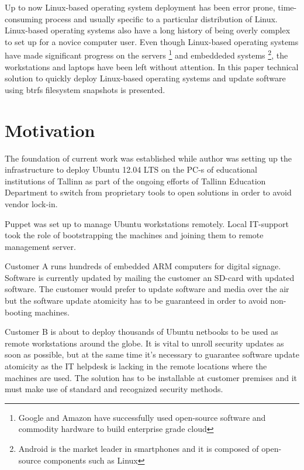 \documentclass[a4paper,11pt]{kth-mag}
\begin{document}
Up to now Linux-based operating system deployment has been
error prone, time-consuming process and usually specific to
a particular distribution of Linux.
Linux-based operating systems also have a long history
of being overly complex to set up for a novice computer user.
Even though Linux-based operating systems have made significant
progress on the servers
\footnote{Google and Amazon have successfully used open-source software
and commodity hardware to build enterprise grade cloud}
and embeddeded systems
\footnote{Android is the market leader in smartphones and it is composed of open-source components such as Linux},
the workstations and laptops have been left without attention.
In this paper technical solution to quickly
deploy Linux-based operating systems
and update software using
\acrshort{btrfs} filesystem snapshots is presented.

\section{Motivation}
\label{sec:mot}
The foundation of current work was established while author was setting up
the infrastructure to deploy Ubuntu 12.04 LTS on the PC-s of educational
institutions of Tallinn as part of the ongoing efforts of Tallinn Education
Department to switch from proprietary tools to open solutions
in order to avoid vendor lock-in.

Puppet was set up to manage Ubuntu workstations remotely. Local IT-support
took the role of bootstrapping the machines and joining them to remote
management server.

Customer A runs hundreds of embedded ARM computers for digital signage.
Software is currently updated by mailing the customer an SD-card with
updated software. The customer would prefer to update software and
media over the air but the software update atomicity has to be guaranteed
in order to avoid non-booting machines.

Customer B is about to deploy thousands of Ubuntu netbooks to be used as
remote workstations around the globe. It is vital to unroll security updates
as soon as possible, but at the same time it's necessary to guarantee
software update atomicity as the IT helpdesk is lacking in the remote
locations where the machines are used.
The solution has to be installable at customer premises and it
must make use of standard and recognized security methods.
\end{document}
